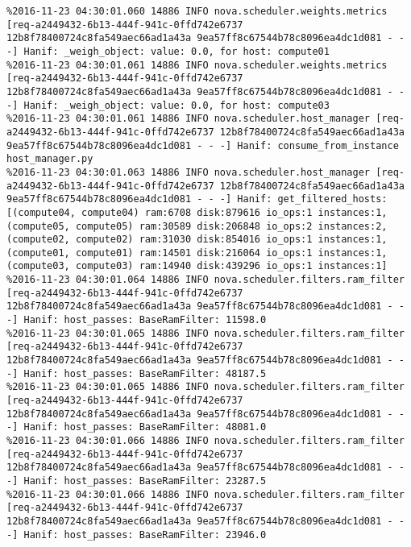 \begin{lstlisting}[frame=single, caption={The filter scheduler log trace for 10 virtual instances}, label={lst:filterschedulercodetracelog10vi}, escapechar=|]
%2016-11-23 04:30:01.060 14886 INFO nova.scheduler.weights.metrics [req-a2449432-6b13-444f-941c-0ffd742e6737 12b8f78400724c8fa549aec66ad1a43a 9ea57ff8c67544b78c8096ea4dc1d081 - - -] Hanif: _weigh_object: value: 0.0, for host: compute02
%2016-11-23 04:30:01.060 14886 INFO nova.scheduler.weights.metrics [req-a2449432-6b13-444f-941c-0ffd742e6737 12b8f78400724c8fa549aec66ad1a43a 9ea57ff8c67544b78c8096ea4dc1d081 - - -] Hanif: _weigh_object: value: 0.0, for host: compute01
%2016-11-23 04:30:01.061 14886 INFO nova.scheduler.weights.metrics [req-a2449432-6b13-444f-941c-0ffd742e6737 12b8f78400724c8fa549aec66ad1a43a 9ea57ff8c67544b78c8096ea4dc1d081 - - -] Hanif: _weigh_object: value: 0.0, for host: compute03
%2016-11-23 04:30:01.061 14886 INFO nova.scheduler.host_manager [req-a2449432-6b13-444f-941c-0ffd742e6737 12b8f78400724c8fa549aec66ad1a43a 9ea57ff8c67544b78c8096ea4dc1d081 - - -] Hanif: consume_from_instance host_manager.py
%2016-11-23 04:30:01.063 14886 INFO nova.scheduler.host_manager [req-a2449432-6b13-444f-941c-0ffd742e6737 12b8f78400724c8fa549aec66ad1a43a 9ea57ff8c67544b78c8096ea4dc1d081 - - -] Hanif: get_filtered_hosts: [(compute04, compute04) ram:6708 disk:879616 io_ops:1 instances:1, (compute05, compute05) ram:30589 disk:206848 io_ops:2 instances:2, (compute02, compute02) ram:31030 disk:854016 io_ops:1 instances:1, (compute01, compute01) ram:14501 disk:216064 io_ops:1 instances:1, (compute03, compute03) ram:14940 disk:439296 io_ops:1 instances:1]
%2016-11-23 04:30:01.064 14886 INFO nova.scheduler.filters.ram_filter [req-a2449432-6b13-444f-941c-0ffd742e6737 12b8f78400724c8fa549aec66ad1a43a 9ea57ff8c67544b78c8096ea4dc1d081 - - -] Hanif: host_passes: BaseRamFilter: 11598.0
%2016-11-23 04:30:01.065 14886 INFO nova.scheduler.filters.ram_filter [req-a2449432-6b13-444f-941c-0ffd742e6737 12b8f78400724c8fa549aec66ad1a43a 9ea57ff8c67544b78c8096ea4dc1d081 - - -] Hanif: host_passes: BaseRamFilter: 48187.5
%2016-11-23 04:30:01.065 14886 INFO nova.scheduler.filters.ram_filter [req-a2449432-6b13-444f-941c-0ffd742e6737 12b8f78400724c8fa549aec66ad1a43a 9ea57ff8c67544b78c8096ea4dc1d081 - - -] Hanif: host_passes: BaseRamFilter: 48081.0
%2016-11-23 04:30:01.066 14886 INFO nova.scheduler.filters.ram_filter [req-a2449432-6b13-444f-941c-0ffd742e6737 12b8f78400724c8fa549aec66ad1a43a 9ea57ff8c67544b78c8096ea4dc1d081 - - -] Hanif: host_passes: BaseRamFilter: 23287.5
%2016-11-23 04:30:01.066 14886 INFO nova.scheduler.filters.ram_filter [req-a2449432-6b13-444f-941c-0ffd742e6737 12b8f78400724c8fa549aec66ad1a43a 9ea57ff8c67544b78c8096ea4dc1d081 - - -] Hanif: host_passes: BaseRamFilter: 23946.0

\end{lstlisting}
